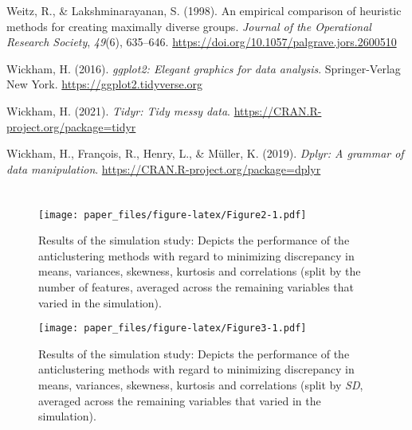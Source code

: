 \documentclass[
  man,floatsintext]{apa7}
\newlength{\cslhangindent}
\newlength{\cslentryspacingunit} %
\newenvironment{CSLReferences}[2] %
 {%
  \setlength{\parindent}{0pt}
  \ifodd #1
  \let\oldpar\par
  \def\par{\hangindent=\cslhangindent\oldpar}
  \fi
  \setlength{\parskip}{#2\cslentryspacingunit}
 }%
 {}
\begin{document}
\begin{CSLReferences}{1}{0}
\leavevmode{}%
Weitz, R., \& Lakshminarayanan, S. (1998). An empirical comparison of heuristic methods for creating maximally diverse groups. \emph{Journal of the Operational Research Society}, \emph{49}(6), 635--646. \url{https://doi.org/10.1057/palgrave.jors.2600510}

\leavevmode{}%
Wickham, H. (2016). \emph{ggplot2: Elegant graphics for data analysis}. Springer-Verlag New York. \url{https://ggplot2.tidyverse.org}

\leavevmode{}%
Wickham, H. (2021). \emph{Tidyr: Tidy messy data}. \url{https://CRAN.R-project.org/package=tidyr}

\leavevmode{}%
Wickham, H., François, R., Henry, L., \& Müller, K. (2019). \emph{Dplyr: A grammar of data manipulation}. \url{https://CRAN.R-project.org/package=dplyr}

\end{CSLReferences}

\endgroup

\newpage

\hypertarget{appendix-appendix}{%
\appendix}


\hypertarget{section}{%
\section{}\label{section}}

\begin{figure}
\centering
\texttt{[image: paper\_files/figure-latex/Figure2-1.pdf]}
\caption{\label{fig:Figure2}Results of the simulation study: Depicts the performance of the anticlustering methods with regard to minimizing discrepancy in means, variances, skewness, kurtosis and correlations (split by the number of features, averaged across the remaining variables that varied in the simulation).}
\end{figure}

\begin{figure}
\centering
\texttt{[image: paper\_files/figure-latex/Figure3-1.pdf]}
\caption{\label{fig:Figure3}Results of the simulation study: Depicts the performance of the anticlustering methods with regard to minimizing discrepancy in means, variances, skewness, kurtosis and correlations (split by \emph{SD}, averaged across the remaining variables that varied in the simulation).}
\end{figure}
\end{document}
